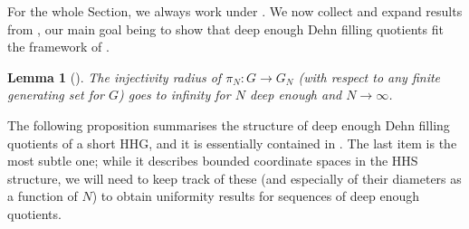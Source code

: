\documentclass[svgnames]{amsart}
\theoremstyle{plain}
\newtheorem{lem}[thm]{Lemma}
\theoremstyle{definition}
\begin{document}
\noindent For the whole Section, we always work under . We now collect and expand results from \cite{short_HHG:II}, our main goal being to show that deep enough Dehn filling quotients fit the framework of .



\begin{lem}[{\cite[Corollary 3.40]{short_HHG:II}}]\label{lem_injrad_of_shortquot} The injectivity radius of $\pi_N\colon G\to G_N$ (with respect to any finite generating set for $G$) goes to infinity for $N$ deep enough and $N\to \infty$.
\end{lem}


\noindent The following proposition summarises the structure of deep enough Dehn filling quotients of a short HHG, and it is essentially contained in \cite{short_HHG:II}. The last item is the most subtle one; while it describes bounded coordinate spaces in the HHS structure, we will need to keep track of these (and especially of their diameters as a function of $N$) to obtain uniformity results for sequences of deep enough quotients.
\end{document}

